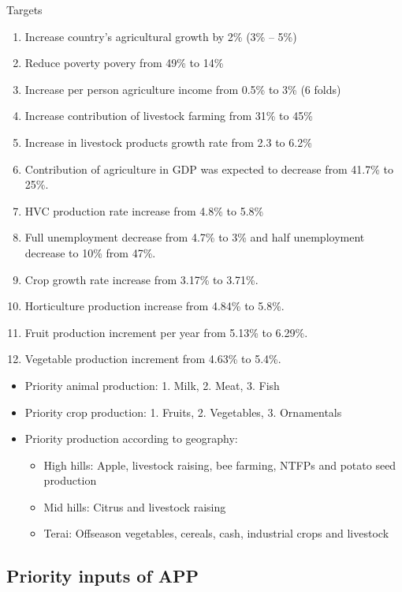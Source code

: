 \documentclass[
  openany]{book}
\providecommand{\tightlist}{%
  \setlength{\itemsep}{0pt}\setlength{\parskip}{0pt}}
\begin{document}
Targets

\begin{enumerate}
\def\labelenumi{\arabic{enumi}.}
\tightlist
\item
  Increase country's agricultural growth by 2\% (3\% -- 5\%)
\item
  Reduce poverty povery from 49\% to 14\%
\item
  Increase per person agriculture income from 0.5\% to 3\% (6 folds)
\item
  Increase contribution of livestock farming from 31\% to 45\%
\item
  Increase in livestock products growth rate from 2.3 to 6.2\%
\item
  Contribution of agriculture in GDP was expected to decrease from 41.7\% to 25\%.
\item
  HVC production rate increase from 4.8\% to 5.8\%
\item
  Full unemployment decrease from 4.7\% to 3\% and half unemployment decrease to 10\% from 47\%.
\item
  Crop growth rate increase from 3.17\% to 3.71\%.
\item
  Horticulture production increase from 4.84\% to 5.8\%.
\item
  Fruit production increment per year from 5.13\% to 6.29\%.
\item
  Vegetable production increment from 4.63\% to 5.4\%.
\end{enumerate}

\begin{itemize}
\tightlist
\item
  Priority animal production: 1. Milk, 2. Meat, 3. Fish
\item
  Priority crop production: 1. Fruits, 2. Vegetables, 3. Ornamentals
\item
  Priority production according to geography:

  \begin{itemize}
  \tightlist
  \item
    High hills: Apple, livestock raising, bee farming, NTFPs and potato seed production
  \item
    Mid hills: Citrus and livestock raising
  \item
    Terai: Offseason vegetables, cereals, cash, industrial crops and livestock
  \end{itemize}
\end{itemize}

\hypertarget{priority-inputs-of-app}{%
\subsection{Priority inputs of APP}\label{priority-inputs-of-app}}
\end{document}
